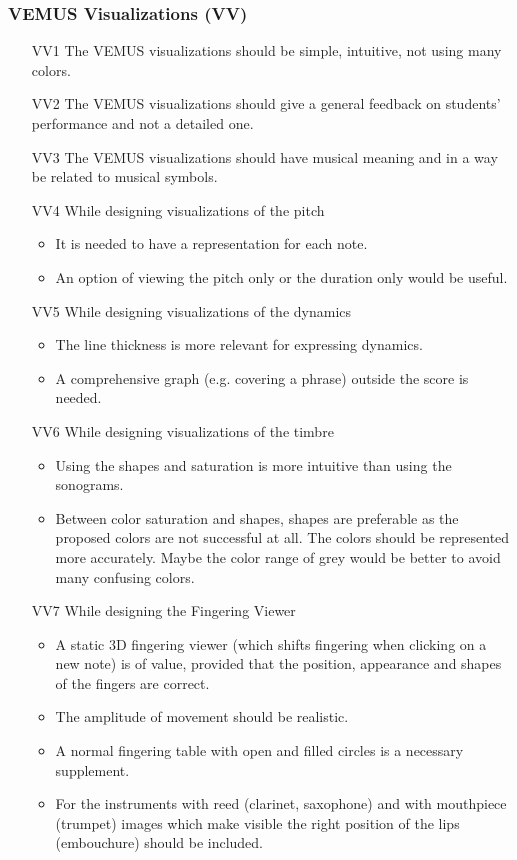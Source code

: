 \subsubsection{VEMUS Visualizations (VV)}
\begin{itemize}
\item[VV1] The VEMUS visualizations should be simple, intuitive, not using many colors.
\item[VV2] The VEMUS visualizations should give a general feedback on students' performance and not a detailed one.
\item[VV3] The VEMUS visualizations should have musical meaning and in a way be related to musical symbols.
\item[VV4] While designing visualizations of the pitch\begin{itemize}
\item It is needed to have a representation for each note.
\item An option of viewing the pitch only or the duration only would be useful.
\end{itemize}

\item[VV5] While designing visualizations of the dynamics\begin{itemize}
\item The line thickness is more relevant for expressing dynamics.
\item A comprehensive graph (e.g. covering a phrase) outside the score is needed.
\end{itemize}

\item[VV6] While designing visualizations of the timbre\begin{itemize}
\item Using the shapes and saturation is more intuitive than using the sonograms.
\item Between color saturation and shapes, shapes are preferable as the proposed colors are not successful at all. The colors should be represented more accurately. Maybe the color range of grey would be better to avoid many confusing colors.
\end{itemize}

\item[VV7] While designing the Fingering Viewer\begin{itemize}
\item A static 3D fingering viewer (which shifts fingering when clicking on a new note) is of value, provided that the position, appearance and shapes of the fingers are correct.
\item The amplitude of movement should be realistic.
\item A normal fingering table with open and filled circles is a necessary supplement.
\item For the instruments with reed (clarinet, saxophone) and with mouthpiece (trumpet) images which make visible the right position of the lips (embouchure) should be included.
\end{itemize}


\end{itemize}
